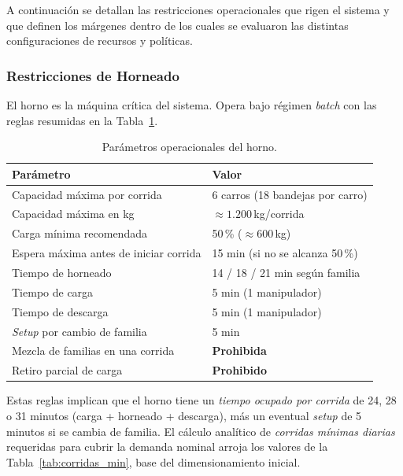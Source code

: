 \documentclass[10pt, a4paper]{article}
\begin{document}
A continuaci\'on se detallan las restricciones operacionales que rigen el sistema
y que definen los m\'argenes dentro de los cuales se evaluaron las distintas
configuraciones de recursos y pol\'iticas.

\subsubsection{Restricciones de Horneado}
\label{sssec:restr_hornos}

El horno es la m\'aquina cr\'itica del sistema. Opera bajo r\'egimen
\textit{batch} con las reglas resumidas en la Tabla~\ref{tab:horno_params}.

\begin{table}[H]
\centering
\caption{Par\'ametros operacionales del horno.}
\label{tab:horno_params}
\renewcommand{\arraystretch}{1.25}
\begin{tabular}{p{6.8cm} l}
\toprule
\rowcolor{azulClaro}
\textbf{Par\'ametro} & \textbf{Valor} \\
\midrule
Capacidad m\'axima por corrida           & 6 carros (18 bandejas por carro)\\
\rowcolor{grisClaro}
Capacidad m\'axima en kg                 & $\approx 1.200$\,kg/corrida \\
Carga m\'inima recomendada               & 50\,\% ($\approx 600$\,kg) \\
\rowcolor{grisClaro}
Espera m\'axima antes de iniciar corrida & 15 min (si no se alcanza 50\,\%) \\
Tiempo de horneado                       & 14 / 18 / 21 min seg\'un familia \\
\rowcolor{grisClaro}
Tiempo de carga                          & 5 min (1 manipulador) \\
Tiempo de descarga                       & 5 min (1 manipulador) \\
\rowcolor{grisClaro}
\textit{Setup} por cambio de familia     & 5 min \\
Mezcla de familias en una corrida        & \textbf{Prohibida} \\
\rowcolor{grisClaro}
Retiro parcial de carga                  & \textbf{Prohibido} \\
\bottomrule
\end{tabular}
\end{table}

Estas reglas implican que el horno tiene un \emph{tiempo ocupado por corrida} de
24, 28 o 31 minutos (carga + horneado + descarga), m\'as un eventual
\textit{setup} de 5 minutos si se cambia de familia. El c\'alculo anal\'itico de
\emph{corridas m\'inimas diarias} requeridas para cubrir la demanda nominal
arroja los valores de la Tabla~\ref{tab:corridas_min}, base del dimensionamiento
inicial.
\end{document}

